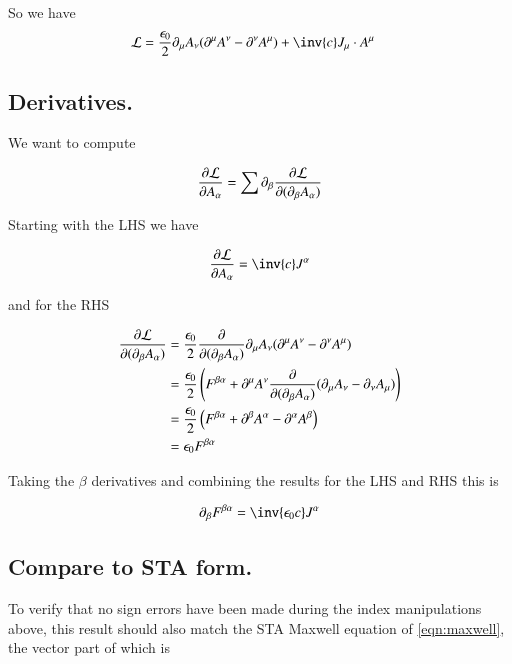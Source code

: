 \documentclass{article}
\begin{document}
So we have
\begin{align*}
\LL &= \frac{\epsilon_0}{2} \partial_\mu A_\nu (\partial^\mu A^\nu - \partial^\nu A^\mu)
+ \inv{c} J_\mu \cdot A^\mu
\end{align*}

\subsection{ Derivatives. }

We want to compute

\begin{align}
\frac{\partial {\mathcal{L}}}{\partial {A_\alpha}} = \sum \partial_\beta \frac{\partial {\mathcal{L}}}{\partial {(\partial_\beta A_\alpha)}}
\end{align}

Starting with the LHS we have

\begin{align*}
\PD{A_\alpha}{\LL} = \inv{c} J^\alpha 
\end{align*}

and for the RHS

\begin{align*}
\frac{\partial {\mathcal{L}}}{\partial {(\partial_\beta A_\alpha)}}
&=
\frac{\epsilon_0}{2} 
\frac{\partial {}}{\partial {(\partial_\beta A_\alpha)}}
\partial_\mu A_\nu (\partial^\mu A^\nu - \partial^\nu A^\mu) \\
&=
\frac{\epsilon_0}{2} 
\left(
F^{\beta\alpha}
+
\partial^\mu A^\nu 
\frac{\partial {}}{\partial {(\partial_\beta A_\alpha)}}
(\partial_\mu A_\nu - \partial_\nu A_\mu) 
\right) \\
&=
\frac{\epsilon_0}{2} 
\left(
F^{\beta\alpha}
+ \partial^\beta A^\alpha 
-\partial^\alpha A^\beta 
\right) \\
&=
{\epsilon_0} F^{\beta\alpha} \\
\end{align*}

Taking the $\beta$ derivatives and combining the results for the LHS and RHS this is

\begin{align}\label{eqn:maxwellTensor}
\partial_\beta F^{\beta\alpha} = \inv{\epsilon_0 c} J^\alpha 
\end{align}

\subsection{ Compare to STA form. }

To verify that no sign errors have been made during the index manipulations above, this result should also match
the STA Maxwell equation of \ref{eqn:maxwell}, the vector part of which is
\end{document}
